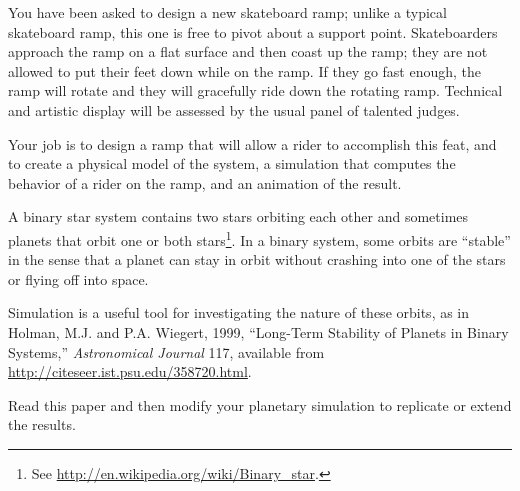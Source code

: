 \documentclass{book}
\begin{document}
\begin{ex}
You have been asked to design a new skateboard ramp; unlike a typical
skateboard ramp, this one is free to pivot about a support point.
Skateboarders approach the ramp on a flat surface and then coast up
the ramp; they are not allowed to put their feet down while on the
ramp. If they go fast enough, the ramp will rotate and they will
gracefully ride down the rotating ramp. Technical and artistic
display will be assessed by the usual panel of talented judges.

Your job is to design a ramp that will allow a rider to accomplish
this feat, and to create a physical model of the system, a
simulation that computes the behavior of a rider on the ramp, and an
animation of the result.
\end{ex}

\begin{ex}
\label{binary}

A binary star system contains two stars orbiting each other and
sometimes planets that orbit one or both stars\footnote{See
\url{http://en.wikipedia.org/wiki/Binary_star}.}. In a binary
system, some orbits are ``stable'' in the sense that a planet can stay
in orbit without crashing into one of the stars or flying off into
space.

Simulation is a useful tool for investigating the nature of these
orbits, as in Holman, M.J. and P.A. Wiegert, 1999, ``Long-Term Stability
of Planets in Binary Systems,'' {\em Astronomical Journal} 117, 
available from \url{http://citeseer.ist.psu.edu/358720.html}.

Read this paper and then modify your planetary simulation to
replicate or extend the results.
\end{ex}

\newpage

\end{document}

